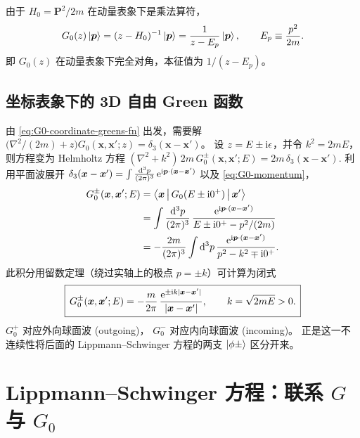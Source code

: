 由于 $H_0=\bm P^2/2m$ 在动量表象下是乘法算符，
\begin{equation}\label{eq:G0-momentum}
  G_0(z)\ket{\bm p} = (z-H_0)^{-1}\ket{\bm p}
  = \frac{1}{z-E_p}\ket{\bm p},\qquad
  E_p \equiv \frac{p^2}{2m}.
\end{equation}
即 $G_0(z)$ 在动量表象下完全对角，本征值为 $1/(z-E_p)$。

\subsection{坐标表象下的 3D 自由 Green 函数}

由 \eqref{eq:G0-coordinate-greens-fn} 出发，需要解
$\bigl(\nabla^2/(2m)+z\bigr) G_0(\bm x,\bm x';z)=\delta_3(\bm x-\bm x')$。
设 $z=E\pm\mathrm{i}\epsilon$，并令 $k^2=2mE$，则方程变为 Helmholtz 方程
$(\nabla^2+k^2)\,2m\,G_0^\pm(\bm x,\bm x';E)=2m\,\delta_3(\bm x-\bm x')$.
利用平面波展开
$\delta_3(\bm x-\bm x')=\int\frac{\mathrm{d}^3 p}{(2\pi)^3}\,\mathrm{e}^{\mathrm{i}\bm p\cdot(\bm x-\bm x')}$
以及 \eqref{eq:G0-momentum}，
\begin{align}
  G_0^\pm(\bm x,\bm x';E)
  &= \left\langle \bm x \,\middle|\, G_0(E\pm\mathrm{i} 0^+) \,\middle|\, \bm x' \right\rangle\notag\\
  &= \int\frac{\mathrm{d}^3 p}{(2\pi)^3}\,
     \frac{\mathrm{e}^{\mathrm{i}\bm p\cdot(\bm x-\bm x')}}{E\pm\mathrm{i} 0^+ - p^2/(2m)}\notag\\
  &= -\frac{2m}{(2\pi)^3}\int\mathrm{d}^3 p\,
     \frac{\mathrm{e}^{\mathrm{i}\bm p\cdot(\bm x-\bm x')}}{p^2-k^2\mp\mathrm{i} 0^+}.
\end{align}
此积分用留数定理（绕过实轴上的极点 $p=\pm k$）可计算为闭式
\begin{equation}\label{eq:G0-3d-coord}
  \boxed{\,G_0^\pm(\bm x,\bm x';E)
  = -\frac{m}{2\pi}\,\frac{\mathrm{e}^{\pm\mathrm{i} k|\bm x-\bm x'|}}{|\bm x-\bm x'|},\qquad
  k=\sqrt{2mE}>0.\,}
\end{equation}
$G_0^+$ 对应外向球面波 (outgoing)，
$G_0^-$ 对应内向球面波 (incoming)。
正是这一不连续性将后面的 Lippmann--Schwinger 方程的两支
$\ket{\phi\pm}$ 区分开来。

\section{Lippmann--Schwinger 方程：联系 $G$ 与 $G_0$}

